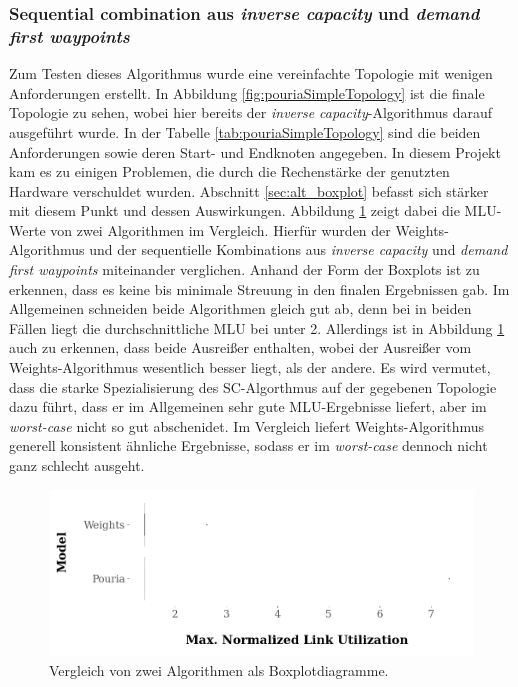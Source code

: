 \documentclass[sigconf, nonacm, review]{acmart}
\begin{document}
\subsubsection{Sequential combination aus \emph{inverse capacity} und \emph{demand first waypoints}}
\label{sec:seq_com_p2}
Zum Testen dieses Algorithmus wurde eine vereinfachte Topologie mit wenigen Anforderungen erstellt.
In Abbildung \ref{fig:pouriaSimpleTopology} ist die finale Topologie zu sehen, 
wobei hier bereits der \emph{inverse capacity}-Algorithmus darauf ausgef\"uhrt wurde.
In der Tabelle \ref{tab:pouriaSimpleTopology} sind die beiden Anforderungen sowie deren Start- und Endknoten angegeben.
In diesem Projekt kam es zu einigen Problemen, die durch die Rechenst\"arke der genutzten Hardware verschuldet wurden.
Abschnitt \ref{sec:alt_boxplot} befasst sich st\"arker mit diesem Punkt und dessen Auswirkungen.
Abbildung \ref{fig:pouria_boxplot_no_boxes} zeigt dabei die MLU-Werte von zwei Algorithmen im Vergleich.
Hierf\"ur wurden der Weights-Algorithmus und der sequentielle Kombinations aus \emph{inverse capacity} und \emph{demand first waypoints} miteinander verglichen.\newline
Anhand der Form der Boxplots ist zu erkennen, dass es keine bis minimale Streuung in den finalen Ergebnissen gab.
Im Allgemeinen schneiden beide Algorithmen gleich gut ab, denn bei in beiden F\"allen liegt die durchschnittliche MLU bei unter 2.
Allerdings ist in Abbildung \ref{fig:pouria_boxplot_no_boxes} auch zu erkennen, dass beide Ausrei\ss er enthalten,
wobei der Ausrei\ss er vom Weights-Algorithmus wesentlich besser liegt, als der andere.
Es wird vermutet, dass die starke Spezialisierung des SC-Algorthmus auf der gegebenen Topologie dazu f\"uhrt, 
dass er im Allgemeinen sehr gute MLU-Ergebnisse liefert,
aber im \emph{worst-case} nicht so gut abschenidet.
Im Vergleich liefert Weights-Algorithmus generell konsistent \"ahnliche Ergebnisse,
sodass er im \emph{worst-case} dennoch nicht ganz schlecht ausgeht.
\begin{figure}
\centering
\includegraphics[width=\linewidth]{figures/pouria_boxplot_no_boxes.png}
\caption{Vergleich von zwei Algorithmen als Boxplotdiagramme.}
\label{fig:pouria_boxplot_no_boxes}
\end{figure}
\end{document}
